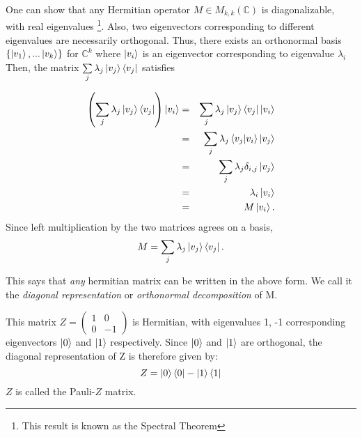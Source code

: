 One can show that any Hermitian operator $M \in M_{k,k}(\mathbb{C})$ is diagonalizable, with real eigenvalues \footnote{This result is known as the Spectral Theorem}.  Also, two eigenvectors corresponding to different eigenvalues are necessarily orthogonal.  Thus, there exists an orthonormal basis $\{\ket{v_1},...\ket{v_k}\}$ for $\mathbb{C}^k$ where $\ket{v_i}$ is an eigenvector corresponding to eigenvalue $\lambda_i$  Then, the matrix $\sum\limits_j \lambda_j \ket{v_j}\bra{v_j}$ satisfies

\begin{eqnarray}
\left(\sum\limits_j \lambda_j\ket{v_j}\bra{v_j}\right)\ket{v_i}&=&\sum\limits_j \lambda_j\ket{v_j}\bra{v_j}\ket{v_i}\\
&=&\sum\limits_j \lambda_j\braket{v_j|v_i}\ket{v_j}\\
&=&\sum\limits_j \lambda_j\delta_{i,j}\ket{v_j}\\
&=&\lambda_i\ket{v_i}\\
&=&M\ket{v_i}.
\end{eqnarray}
Since left multiplication by the two matrices agrees on a basis,
\begin{equation}
M=\sum\limits_j \lambda_j \ket{v_j}\bra{v_j}.    
\end{equation}

This says that {\emph{any}} hermitian matrix can be written in the above form. We call it the \textit{diagonal representation} or \textit{orthonormal decomposition} of M.
\begin{example} \label{example-pauli z diagonal rep}
This matrix $Z=\left(\begin{smallmatrix}
    1 & 0\\
    0 & -1
    \end{smallmatrix}\right)$
    is Hermitian, with eigenvalues 1, -1 corresponding eigenvectors $\ket{0}$ and  $\ket{1}$ respectively.  Since $\ket{0}$ and $\ket{1}$ are orthogonal, the diagonal representation of Z is therefore given by:
\begin{equation}
    Z=\ket{0}\bra{0}-\ket{1}\bra{1}
\end{equation}
$Z$ is called the Pauli-$Z$ matrix.
\end{example}

